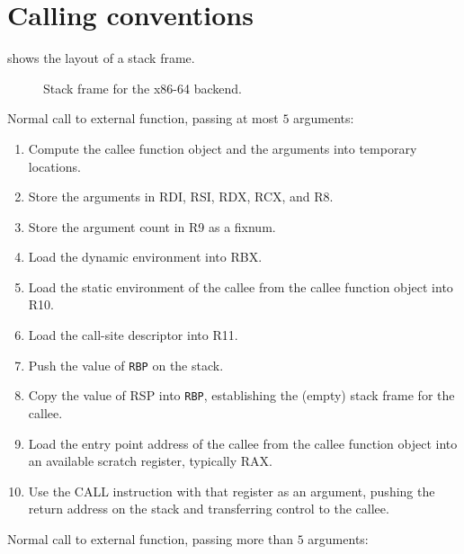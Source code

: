 \section{Calling conventions}
\label{sec-x86-calling-conventions}

 shows the layout of a stack frame.

\begin{figure}
\begin{center}
\end{center}
\caption{\label{fig-x86-64-stack-frame}
Stack frame for the x86-64 backend.}
\end{figure}

Normal call to external function, passing at most $5$ arguments:

\begin{enumerate}
\item Compute the callee function object and the arguments into
  temporary locations.
\item Store the arguments in RDI, RSI, RDX, RCX, and R8.
\item Store the argument count in R9 as a fixnum.
\item Load the dynamic environment into RBX.
\item Load the static environment of the callee from the callee
  function object into R10.
\item Load the call-site descriptor into R11.
\item Push the value of \texttt{RBP} on the stack.
\item Copy the value of RSP into \texttt{RBP}, establishing the
  (empty) stack frame for the callee.
\item Load the entry point address of the callee from the callee
  function object into an available scratch register, typically RAX.
\item Use the CALL instruction with that register as an argument,
  pushing the return address on the stack and transferring control to
  the callee.
\end{enumerate}

Normal call to external function, passing more than $5$ arguments:

